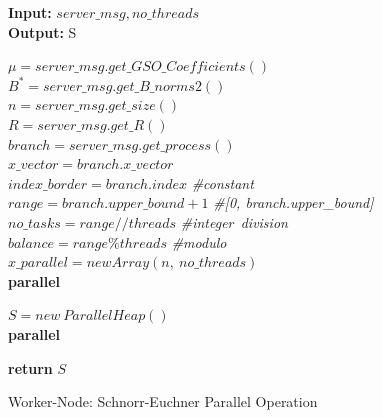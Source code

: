 \begin{algorithm}[h] \label{split-worker}
\SetAlgoLined

{\bf Input:} $ server\_msg, no\_threads $ \\
{\bf Output:} S \\

\hfill

$ μ = server\_msg.get\_GSO\_Coefficients() $ \\
$ B^* = server\_msg.get\_B\_norms2() $ \\
$ n = server\_msg.get\_size() $ \\
$ R = server\_msg.get\_R() $ \\
$ branch = server\_msg.get\_process() $ \\


$ x\_vector = branch.x\_vector $ \\

$ index\_border = branch.index $ \qquad \qquad \emph{\#constant}\\
$ range = branch.upper\_bound + 1 $ \qquad \emph{\#[0, branch.upper\_bound]} \\ 
$ no\_tasks = range // threads $ \qquad \emph{\#integer\ division} \\
$ balance = range \% threads $ \qquad \emph{\#modulo} \\

$ x\_parallel = new Array(n,\ no\_threads) $ \\
\textbf{parallel}

$ S = new \ ParallelHeap() $ \\
\textbf{parallel}



\textbf{return} $ S $

\caption{Worker-Node: Schnorr-Euchner Parallel Operation}
\end{algorithm}





